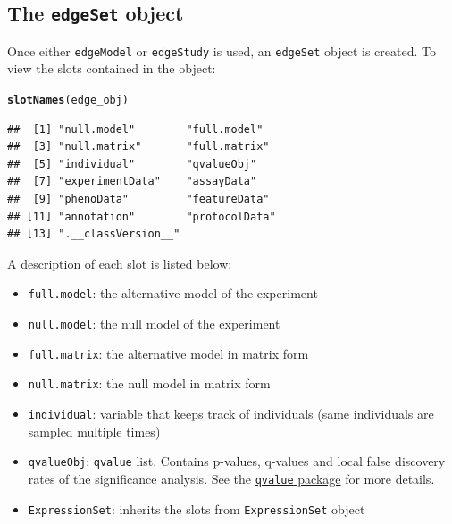 \documentclass{article}\usepackage[]{graphicx}\usepackage[]{color}
\makeatletter
\newcommand{\hlstd}[1]{\textcolor[rgb]{0.345,0.345,0.345}{#1}}%
\newcommand{\hlkwd}[1]{\textcolor[rgb]{0.737,0.353,0.396}{\textbf{#1}}}%
\newenvironment{kframe}{%
 \def\at@end@of@kframe{}%
 \ifinner\ifhmode%
  \def\at@end@of@kframe{\end{minipage}}%
  \begin{minipage}{\columnwidth}%
 \fi\fi%
 \def\FrameCommand##1{\hskip\@totalleftmargin \hskip-\fboxsep
 \colorbox{shadecolor}{##1}\hskip-\fboxsep
     \hskip-\linewidth \hskip-\@totalleftmargin \hskip\columnwidth}%
 \MakeFramed {\advance\hsize-\width
   \@totalleftmargin\z@ \linewidth\hsize
   \@setminipage}}%
 {\par\unskip\endMakeFramed%
 \at@end@of@kframe}
\newenvironment{knitrout}{}{} %
\makeatother
\begin{document}
\subsection{The {\tt edgeSet} object}
\label{subsec:edgeSet}
Once either {\tt edgeModel} or {\tt edgeStudy} is used, an {\tt edgeSet} object is created. To view the slots contained in the object:
\begin{knitrout}
\color{fgcolor}\begin{kframe}
\begin{alltt}
\hlkwd{slotNames}\hlstd{(edge_obj)}
\end{alltt}
\begin{verbatim}
##  [1] "null.model"        "full.model"       
##  [3] "null.matrix"       "full.matrix"      
##  [5] "individual"        "qvalueObj"        
##  [7] "experimentData"    "assayData"        
##  [9] "phenoData"         "featureData"      
## [11] "annotation"        "protocolData"     
## [13] ".__classVersion__"
\end{verbatim}
\end{kframe}
\end{knitrout}
A description of each slot is listed below: 
\begin{itemize}
\item {\tt full.model}: the alternative model of the experiment
\item {\tt null.model}: the null model of the experiment
\item {\tt full.matrix}: the alternative model in matrix form
\item {\tt null.matrix}: the null model in matrix form
\item {\tt individual}: variable that keeps track of individuals (same individuals are sampled multiple times)
\item {\tt qvalueObj}: {\tt qvalue} list. Contains p-values, q-values and local false discovery rates of the significance analysis. See the \href{http://www.bioconductor.org/packages/release/bioc/html/qvalue.html}{{\tt qvalue} package} for more details.
\item {\tt ExpressionSet}: inherits the slots from {\tt ExpressionSet} object
\end{itemize}
\end{document}
